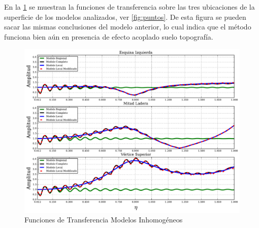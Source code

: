 \documentclass[spanish,letterpaper,12pt,twoside,openany]{article}
\begin{document}
En la \cref{fig:tfinhom} se muestran la funciones de transferencia sobre las tres ubicaciones de la superficie de los modelos analizados, ver \cref{fig:puntos}. De esta figura se pueden sacar las mismas conclusiones del modelo anterior, lo cual indica que el método funciona bien aún en presencia de efecto acoplado suelo topografía.

\begin{figure}[H]
	\centering
	\includegraphics[width=15 cm]{img/TransFuncInHom.pdf}
	\vspace{-.5 cm}
	\caption{Funciones de Transferencia Modelos Inhomogéneos}
	\label{fig:tfinhom}
	\vspace{-1 cm}
\end{figure}
%
%
%
%
%


\end{document}
